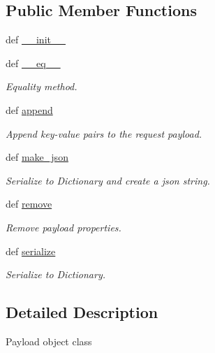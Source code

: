 \subsection*{Public Member Functions}
\begin{DoxyCompactItemize}
\item 
def \hyperlink{classRappCloud_1_1Objects_1_1Payload_1_1Payload_a4d10d40ae073f866b966c9728475d240}{\-\_\-\-\_\-init\-\_\-\-\_\-}
\item 
def \hyperlink{classRappCloud_1_1Objects_1_1Payload_1_1Payload_abf6da30ac1607f0f7edad21c7d3404ff}{\-\_\-\-\_\-eq\-\_\-\-\_\-}
\begin{DoxyCompactList}\small\item\em Equality method. \end{DoxyCompactList}\item 
def \hyperlink{classRappCloud_1_1Objects_1_1Payload_1_1Payload_a68469792c5e2f89a66b8ad98e1d7b7fb}{append}
\begin{DoxyCompactList}\small\item\em Append key-\/value pairs to the request payload. \end{DoxyCompactList}\item 
def \hyperlink{classRappCloud_1_1Objects_1_1Payload_1_1Payload_a96039916782ca1c8ccd0f4ff70449ac5}{make\-\_\-json}
\begin{DoxyCompactList}\small\item\em Serialize to Dictionary and create a json string. \end{DoxyCompactList}\item 
def \hyperlink{classRappCloud_1_1Objects_1_1Payload_1_1Payload_ac8a4366726c32fe64e3ab030f41e8812}{remove}
\begin{DoxyCompactList}\small\item\em Remove payload properties. \end{DoxyCompactList}\item 
def \hyperlink{classRappCloud_1_1Objects_1_1Payload_1_1Payload_add505d2d92e7e95b03907b2f954ec5a4}{serialize}
\begin{DoxyCompactList}\small\item\em Serialize to Dictionary. \end{DoxyCompactList}\end{DoxyCompactItemize}


\subsection{Detailed Description}
\begin{DoxyVerb}Payload object class \end{DoxyVerb}
 

